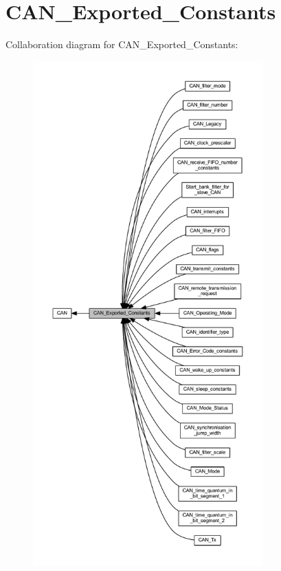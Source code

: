 \hypertarget{group___c_a_n___exported___constants}{}\section{C\+A\+N\+\_\+\+Exported\+\_\+\+Constants}
\label{group___c_a_n___exported___constants}
Collaboration diagram for C\+A\+N\+\_\+\+Exported\+\_\+\+Constants\+:
\nopagebreak
\begin{figure}[H]
\begin{center}
\leavevmode
\includegraphics[height=550pt]{group___c_a_n___exported___constants}
\end{center}
\end{figure}

